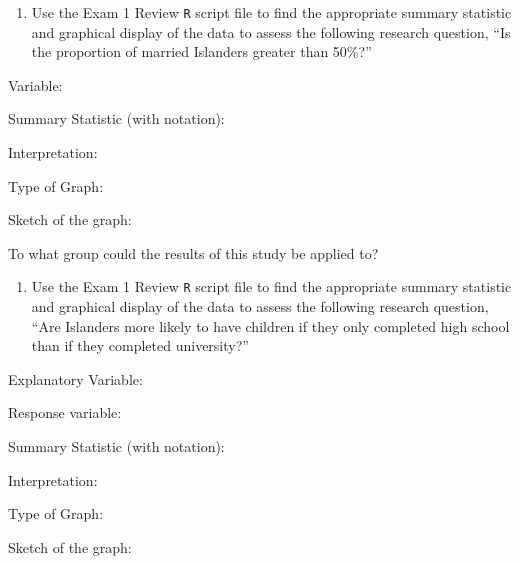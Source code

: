 \documentclass[
]{report}
\providecommand{\tightlist}{%
  \setlength{\itemsep}{0pt}\setlength{\parskip}{0pt}}
\newcommand{\rgi}{\hspace{24pt}}  %
\begin{document}
\vspace{0.5in}

\begin{enumerate}
\def\labelenumi{\arabic{enumi}.}
\setcounter{enumi}{4}
\tightlist
\item
  Use the Exam 1 Review \texttt{R} script file to find the appropriate summary statistic and graphical display of the data to assess the following research question, ``Is the proportion of married Islanders greater than 50\%?''
\end{enumerate}

\rgi Variable:

\rgi Summary Statistic (with notation):

\rgi \rgi Interpretation:

\vspace{0.3in}

\rgi Type of Graph:

\vspace{0.3in}

\rgi Sketch of the graph:

\vspace{2in}

\rgi To what group could the results of this study be applied to?

\vspace{0.3in}

\newpage

\begin{enumerate}
\def\labelenumi{\arabic{enumi}.}
\setcounter{enumi}{5}
\tightlist
\item
  Use the Exam 1 Review \texttt{R} script file to find the appropriate summary statistic and graphical display of the data to assess the following research question, ``Are Islanders more likely to have children if they only completed high school than if they completed university?''
\end{enumerate}

\rgi Explanatory Variable:

\rgi Response variable:

\rgi Summary Statistic (with notation):

\rgi \rgi Interpretation:

\vspace{0.3in}

\rgi Type of Graph:

\vspace{0.3in}

\rgi Sketch of the graph:
\end{document}
